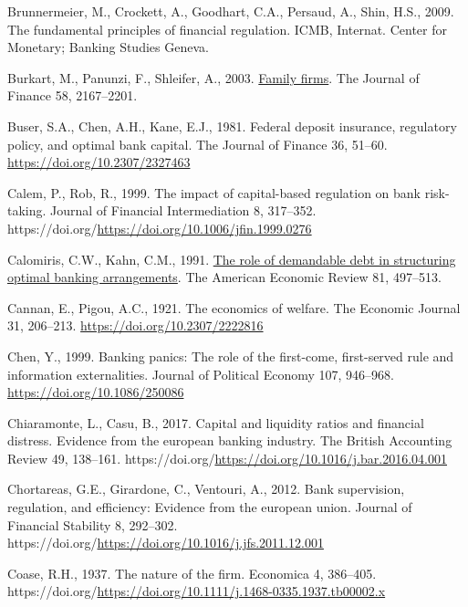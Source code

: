 \documentclass[
  12pt,
  a4paper,
]{scrreprt}
\newlength{\cslhangindent}
\newenvironment{CSLReferences}[2] %
 {\begin{list}{}{%
  \setlength{\itemindent}{0pt}
  \setlength{\leftmargin}{0pt}
  \setlength{\parsep}{0pt}
  \ifodd #1
   \setlength{\leftmargin}{\cslhangindent}
   \setlength{\itemindent}{-1\cslhangindent}
  \fi
  \setlength{\itemsep}{#2\baselineskip}}}
 {\end{list}}
\begin{document}
\begin{CSLReferences}{1}{0}
Brunnermeier, M., Crockett, A., Goodhart, C.A., Persaud, A., Shin, H.S.,
2009. The fundamental principles of financial regulation. ICMB,
Internat. Center for Monetary; Banking Studies Geneva.

Burkart, M., Panunzi, F., Shleifer, A., 2003.
\href{http://www.jstor.org/stable/3648187}{Family firms}. The Journal of
Finance 58, 2167--2201.

Buser, S.A., Chen, A.H., Kane, E.J., 1981. Federal deposit insurance,
regulatory policy, and optimal bank capital. The Journal of Finance 36,
51--60. \url{https://doi.org/10.2307/2327463}

Calem, P., Rob, R., 1999. The impact of capital-based regulation on bank
risk-taking. Journal of Financial Intermediation 8, 317--352.
https://doi.org/\url{https://doi.org/10.1006/jfin.1999.0276}

Calomiris, C.W., Kahn, C.M., 1991.
\href{http://www.jstor.org/stable/2006515}{The role of demandable debt
in structuring optimal banking arrangements}. The American Economic
Review 81, 497--513.

Cannan, E., Pigou, A.C., 1921. The economics of welfare. The Economic
Journal 31, 206--213. \url{https://doi.org/10.2307/2222816}

Chen, Y., 1999. Banking panics: The role of the first-come, first-served
rule and information externalities. Journal of Political Economy 107,
946--968. \url{https://doi.org/10.1086/250086}

Chiaramonte, L., Casu, B., 2017. Capital and liquidity ratios and
financial distress. Evidence from the european banking industry. The
British Accounting Review 49, 138--161.
https://doi.org/\url{https://doi.org/10.1016/j.bar.2016.04.001}

Chortareas, G.E., Girardone, C., Ventouri, A., 2012. Bank supervision,
regulation, and efficiency: Evidence from the european union. Journal of
Financial Stability 8, 292--302.
https://doi.org/\url{https://doi.org/10.1016/j.jfs.2011.12.001}

Coase, R.H., 1937. The nature of the firm. Economica 4, 386--405.
https://doi.org/\url{https://doi.org/10.1111/j.1468-0335.1937.tb00002.x}


\end{CSLReferences}
\end{document}
